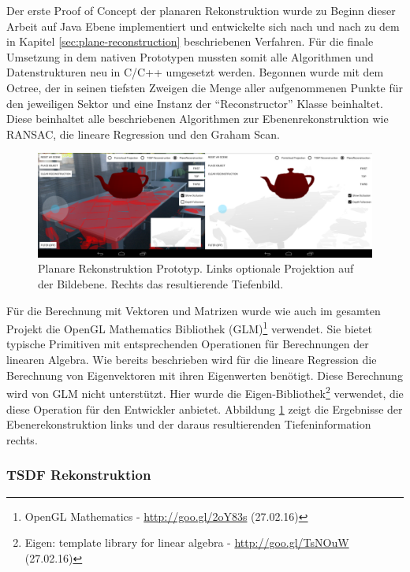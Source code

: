 Der erste Proof of Concept der planaren Rekonstruktion wurde zu Beginn dieser Arbeit auf Java Ebene implementiert und entwickelte sich nach und nach zu dem in Kapitel \ref{sec:plane-reconstruction} beschriebenen Verfahren. Für die finale Umsetzung in dem nativen Prototypen mussten somit alle Algorithmen und Datenstrukturen neu in C/C++ umgesetzt werden. Begonnen wurde mit dem Octree, der in seinen tiefsten Zweigen die Menge aller aufgenommenen Punkte für den jeweiligen Sektor und eine Instanz der \enquote{Reconstructor} Klasse beinhaltet. Diese beinhaltet alle beschriebenen Algorithmen zur Ebenenrekonstruktion wie RANSAC, die lineare Regression und den Graham Scan. 

\begin{figure}[h]
  \centering
	\includegraphics[width=1.0\textwidth]{content/images/implementation/plane-demo.png} 
  \caption{Planare Rekonstruktion Prototyp. Links optionale Projektion auf der Bildebene. Rechts das resultierende Tiefenbild.}
  \label{fig:plane-demo}
\end{figure}

Für die Berechnung mit Vektoren und Matrizen wurde wie auch im gesamten Projekt die OpenGL Mathematics Bibliothek (GLM)\footnote{OpenGL Mathematics - \url{http://goo.gl/2oY83s} (27.02.16)} verwendet. Sie bietet typische Primitiven mit entsprechenden Operationen für Berechnungen der linearen Algebra. Wie bereits beschrieben wird für die lineare Regression die Berechnung von Eigenvektoren mit ihren Eigenwerten benötigt. Diese Berechnung wird von GLM nicht unterstützt. Hier wurde die Eigen-Bibliothek\footnote{Eigen: template library for linear algebra - \url{http://goo.gl/TsNOuW} (27.02.16)} verwendet, die diese Operation für den Entwickler anbietet. Abbildung \ref{fig:plane-demo} zeigt die Ergebnisse der Ebenerekonstruktion links und der daraus resultierenden Tiefeninformation rechts.


\subsubsection*{TSDF Rekonstruktion}

